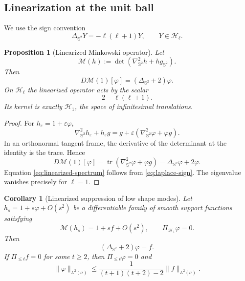 \documentclass[11pt]{article}
\newtheorem{proposition}[theorem]{Proposition}
\newtheorem{corollary}[theorem]{Corollary}
\theoremstyle{definition}
\theoremstyle{remark}
\newcommand{\Sph}{\mathbb S}
\newcommand{\Harm}{\mathcal H}
\newcommand{\tr}{\operatorname{tr}}
\newcommand{\eps}{\varepsilon}
\begin{document}
\subsection{Linearization at the unit ball}
We use the sign convention
\begin{equation}\label{eq:laplace-sign}
\Delta_{\Sph^2}Y=-\ell(\ell+1)Y,\qquad Y\in\Harm_\ell.
\end{equation}

\begin{proposition}[Linearized Minkowski operator]\label{prop:linearized}
Let
\[
\mathcal M(h):=\det(\nabla^2_{\Sph^2}h+h g_{\Sph^2}).
\]
Then
\begin{equation}\label{eq:linearized}
D\mathcal M(1)[\varphi]=(\Delta_{\Sph^2}+2)\varphi.
\end{equation}
On $\Harm_\ell$ the linearized operator acts by the scalar
\begin{equation}\label{eq:linearized-spectrum}
2-\ell(\ell+1).
\end{equation}
Its kernel is exactly $\Harm_1$, the space of infinitesimal translations.
\end{proposition}

\begin{proof}
For $h_\eps=1+\eps\varphi$,
\[
\nabla^2_{\Sph^2}h_\eps+h_\eps g
=g+\eps(\nabla^2_{\Sph^2}\varphi+\varphi g).
\]
In an orthonormal tangent frame, the derivative of the determinant at the identity is the trace. Hence
\[
D\mathcal M(1)[\varphi]
=\tr(\nabla^2_{\Sph^2}\varphi+\varphi g)
=\Delta_{\Sph^2}\varphi+2\varphi.
\]
Equation \eqref{eq:linearized-spectrum} follows from \eqref{eq:laplace-sign}. The eigenvalue vanishes precisely for $\ell=1$.
\end{proof}

\begin{corollary}[Linearized suppression of low shape modes]\label{cor:mode-suppression}
Let $h_s=1+s\varphi+O(s^2)$ be a differentiable family of smooth support functions satisfying
\[
\mathcal M(h_s)=1+s f+O(s^2),
\qquad
\Pi_{\Harm_1}\varphi=0.
\]
Then
\begin{equation}\label{eq:first-response}
(\Delta_{\Sph^2}+2)\varphi=f.
\end{equation}
If $\Pi_{\le t}f=0$ for some $t\ge2$, then $\Pi_{\le t}\varphi=0$ and
\begin{equation}\label{eq:response-bound}
\|\varphi\|_{L^2(\sigma)}
\le\frac1{(t+1)(t+2)-2}\|f\|_{L^2(\sigma)}.
\end{equation}
\end{corollary}
\end{document}
